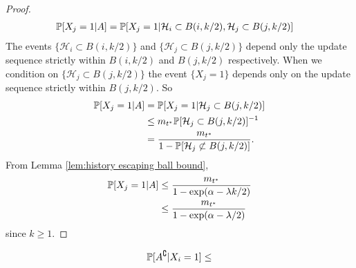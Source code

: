 \begin{proof}
	\begin{align}
		\prob[X_j = 1 | A] &= \prob[X_j = 1 | \mathcal{H}_i \subset B(i, k/2), \mathcal{H}_j \subset B(j, k/2)]%
	\end{align}
	The events $\{\mathcal{H}_i \subset B(i, k/2)\}$ and $\{\mathcal{H}_j \subset B(j, k/2)\}$ depend only the update sequence strictly within $B(i, k/2)$ and $B(j, k/2)$ respectively. When we condition on $\{\mathcal{H}_j \subset B(j, k/2)\}$ the event $\{X_j = 1\}$ depends only on the update sequence strictly within $B(j, k/2)$. So
	\begin{align}
		\mathbb{P}[X_j = 1 | A] &= \mathbb{P}[X_j = 1 | \mathcal{H}_j \subset B(j, k/2)]\\
			&\leq m_{t^*} \mathbb{P}[\mathcal{H}_j \subset B(j, k/2)]^{-1}\\
			&= \frac{m_{t^*}}{1 - \mathbb{P}[\mathcal{H}_j \not\subset B(j, k/2)]}.
	\end{align}
	From Lemma \ref{lem:history escaping ball bound}, 
	\begin{align}
		\mathbb{P}[X_j = 1 | A] &\leq \frac{m_{t^*}}{1 - \exp(\alpha -\lambda k/2)}\\
		&\leq \frac{m_{t^*}}{1 - \exp(\alpha - \lambda/2)}
	\end{align}
	since $k \geq 1$.

\end{proof}
\begin{lemma}
	\begin{equation}
		\mathbb{P}[A^\complement | X_i = 1] \leq 
	\end{equation}
\end{lemma}
